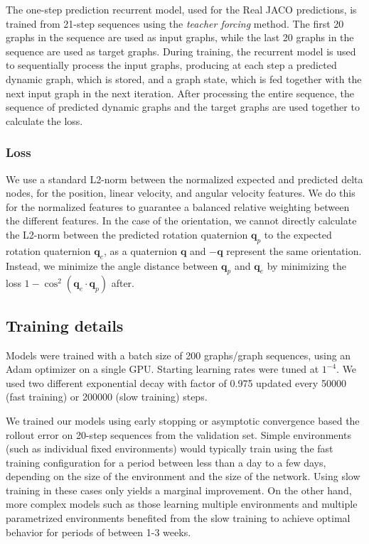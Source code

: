 The one-step prediction recurrent model, used for the Real JACO predictions, is trained from 21-step sequences using the \emph{teacher forcing} method. The first 20 graphs in the sequence are used as input graphs, while the last 20 graphs in the sequence are used as target graphs. During training, the recurrent model is used to sequentially process the input graphs, producing at each step a predicted dynamic graph, which is stored, and a graph state, which is fed together with the next input graph in the next iteration. After processing the entire sequence, the sequence of predicted dynamic graphs and the target graphs are used together to calculate the loss.

\subsubsection{Loss}
\label{sm:sec:training_loss}
We use a standard L2-norm between the normalized expected and predicted delta nodes, for the position, linear velocity, and angular velocity features. We do this for the normalized features to guarantee a balanced relative weighting between the different features. In the case of the orientation, we cannot directly calculate the L2-norm between the predicted rotation quaternion $\textbf{q}_p$ to the expected rotation quaternion $\textbf{q}_e$, as a quaternion $\textbf{q}$ and $-\textbf{q}$ represent the same orientation. Instead, we minimize the angle distance between $\textbf{q}_p$ and $\textbf{q}_e$ by minimizing the loss $1-\cos^2{(\textbf{q}_e\cdotp\textbf{q}_p)}$ after.

\subsection{Training details}
\label{sm:sec:training_details}

Models were trained with a batch size of 200 graphs/graph sequences, using an Adam optimizer on a single GPU. Starting learning rates were tuned at $1^{-4}$. We used two different exponential decay with factor of 0.975 updated every 50000 (fast training) or 200000  (slow training) steps.

We trained our models using early stopping or asymptotic convergence based the rollout error on 20-step sequences from the validation set. Simple environments (such as individual fixed environments) would typically train using the fast training configuration for a period between less than a day to a few days, depending on the size of the environment and the size of the network. Using slow training in these cases only yields a marginal improvement. On the other hand, more complex models such as those learning multiple environments and multiple parametrized environments benefited from the slow training to achieve optimal behavior for periods of between 1-3 weeks.

